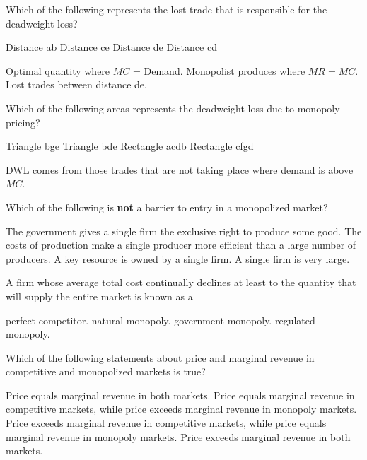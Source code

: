 \documentclass[addpoints,11pt]{exam}
\theoremstyle{definition}
\begin{document}
\begin{questions}
	\question \label{blah5} Which of the following represents the lost trade that is responsible for the deadweight loss?
	
	\begin{choices}
		\choice Distance ab
		\choice Distance ce
		\CorrectChoice Distance de
		\choice Distance cd
	\end{choices}
	
	\begin{solution}
		Optimal quantity where $MC$ = Demand. Monopolist produces where $MR = MC$. Lost trades between distance de.
	\end{solution}
	
	\question \label{blah6} Which of the following areas represents the deadweight loss due to monopoly pricing?
	
	\begin{choices}
		\CorrectChoice Triangle bge
		\choice Triangle bde
		\choice Rectangle acdb
		\choice Rectangle cfgd
	\end{choices}
	
	\begin{solution}
		DWL comes from those trades that are not taking place where demand is above $MC$.
	\end{solution}
	
	
\question Which of the following is \textbf{not} a barrier to entry in a monopolized market?

\begin{choices}
	\choice The government gives a single firm the exclusive right to produce some good.
	\choice The costs of production make a single producer more efficient than a large number of producers.
	\choice A key resource is owned by a single firm.
	\CorrectChoice A single firm is very large.
\end{choices}

\question A firm whose average total cost continually declines at least to the quantity that will supply the entire market is known as a 

\begin{choices}
	\choice perfect competitor.
	\CorrectChoice natural monopoly.
	\choice government monopoly.
	\choice regulated monopoly.
\end{choices}	

\question Which of the following statements about price and marginal revenue in competitive and monopolized markets is true?

\begin{choices}
	\choice Price equals marginal revenue in both markets.
	\CorrectChoice Price equals marginal revenue in competitive markets, while price exceeds marginal revenue in monopoly markets.
	\choice Price exceeds marginal revenue in competitive markets, while price equals marginal revenue in monopoly markets.
	\choice Price exceeds marginal revenue in both markets.
\end{choices}
	

\end{questions}
\end{document}
